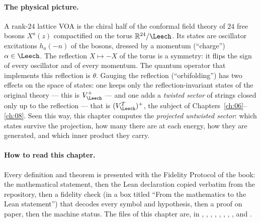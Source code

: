\paragraph{The physical picture.} A rank-$24$ lattice VOA is the chiral half of the conformal
field theory of $24$ free bosons $X^a(z)$ compactified on the torus $\mathbb R^{24}/\Leech$. Its
states are oscillator excitations $h_{a}(-n)$ of the bosons, dressed by a momentum (``charge'')
$\alpha\in\Leech$. The reflection $X\mapsto -X$ of the torus is a symmetry: it flips the sign of every
oscillator and of every momentum. The quantum operator that implements this reflection is $\theta$.
Gauging the reflection (``orbifolding'') has two effects on the space of states: one keeps only the
reflection-invariant states of the original theory --- this is $V_\Leech^+$ --- and one adds a
\emph{twisted sector} of strings closed only up to the reflection --- that is $(V_\Leech^T)^+$,
the subject of Chapters~\ref{ch:06}--\ref{ch:08}. Seen this way, this chapter computes the
\emph{projected untwisted sector}: which states survive the projection, how many there are at
each energy, how they are generated, and which inner product they carry.

\paragraph{How to read this chapter.} Every definition and theorem is presented with the
Fidelity Protocol of the book: the mathematical statement, then the Lean declaration copied
verbatim from the repository, then a fidelity check (in a box titled ``From the mathematics to the
Lean statement'') that decodes every symbol and hypothesis, then a proof on paper, then the
machine status. The files of this chapter are, in ,
, , ,
, , ,
,  and .

